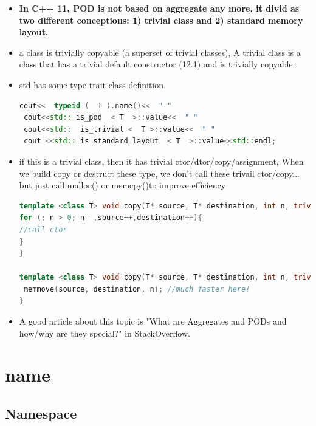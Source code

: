 \documentclass[a4paper,12pt,twoside]{book}
\begin{document}
\begin{itemize}
\item \textbf{In C++ 11, POD is not based on aggregate any more, it divid as two different conceptions: 1) trivial class and 2) standard memory layout. }

\item a class is trivially copyable (a superset of trivial classes), A trivial class is a class that has a trivial default constructor (12.1) and is trivially copyable.

\item std has some type trait class definition. 
\begin{lstlisting}[frame=single, language=c++]
 cout<<  typeid (  T ).name()<<  " "  
 cout<<std:: is_pod  < T  >::value<<  " " 
 cout<<std::  is_trivial <  T >::value<<  " "  
 cout <<std:: is_standard_layout  < T  >::value<<std::endl;
 \end{lstlisting}
 
\item if this is a trivial class, then it has trivial ctor/dtor/copy/assignment, When we build copy or destruct these type, we don't call these trivail ctor/copy... but just call malloc() or memcpy()to improve efficiency 

\begin{lstlisting}[frame=single, language=c++]
template <class T> void copy(T* source, T* destination, int n, trivial_false_type){
for (; n > 0; n--,source++,destination++){
//call ctor
}
}

template <class T> void copy(T* source, T* destination, int n, trivial_true_type){
 memmove(source, destination, n); //much faster here!
}
\end{lstlisting}

\item A good article about this topic is "What are Aggregates and PODs and how/why are they special?" in StackOverflow. 

\end{itemize}


\section{name}
\subsection{Namespace}
\end{document}
